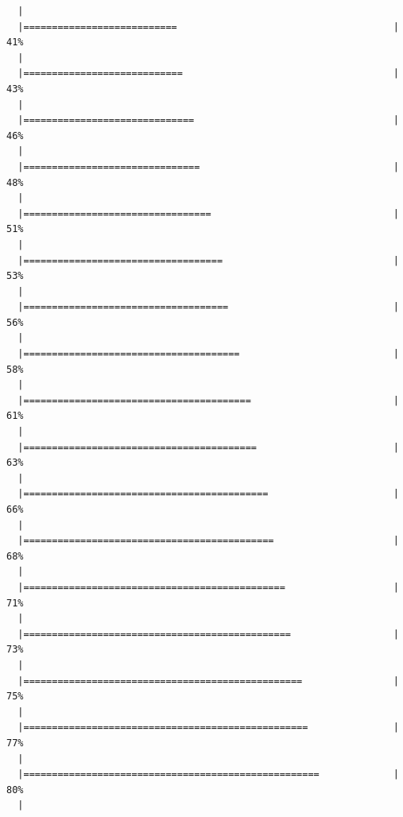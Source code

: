 \documentclass[10pt,letterpaper]{article}
\begin{document}
\begin{verbatim}
  |                                                                       
  |===========================                                      |  41%
  |                                                                       
  |============================                                     |  43%
  |                                                                       
  |==============================                                   |  46%
  |                                                                       
  |===============================                                  |  48%
  |                                                                       
  |=================================                                |  51%
  |                                                                       
  |===================================                              |  53%
  |                                                                       
  |====================================                             |  56%
  |                                                                       
  |======================================                           |  58%
  |                                                                       
  |========================================                         |  61%
  |                                                                       
  |=========================================                        |  63%
  |                                                                       
  |===========================================                      |  66%
  |                                                                       
  |============================================                     |  68%
  |                                                                       
  |==============================================                   |  71%
  |                                                                       
  |===============================================                  |  73%
  |                                                                       
  |=================================================                |  75%
  |                                                                       
  |==================================================               |  77%
  |                                                                       
  |====================================================             |  80%
  |                                                                       

\end{verbatim}
\end{document}
